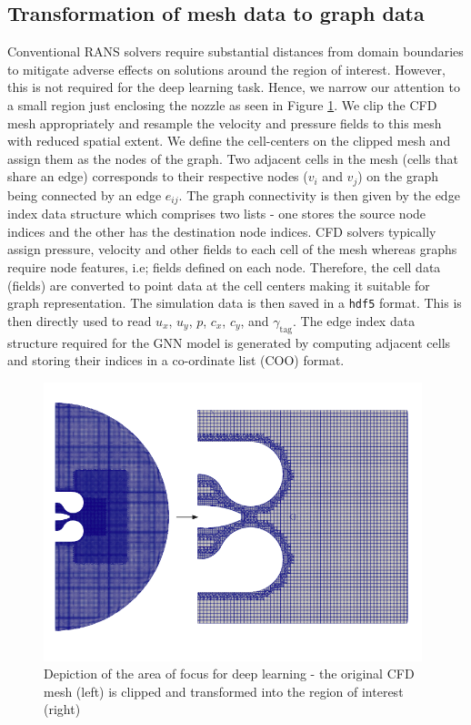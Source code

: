\subsection{Transformation of mesh data to graph data}
Conventional RANS solvers require substantial distances from domain boundaries to mitigate adverse effects on solutions around the region of interest. However, this is not required for the deep learning task. Hence, we narrow our attention to a small region just enclosing the nozzle as seen in Figure \ref{clipmesh}. We clip the CFD mesh appropriately and resample the velocity and pressure fields to this mesh with reduced spatial extent. We define the cell-centers on the clipped mesh and assign them as the nodes of the graph. Two adjacent cells in the mesh (cells that share an edge) corresponds to their respective nodes ($v_i$ and $v_j$) on the graph being connected by an edge $e_{ij}$. The graph connectivity is then given by the edge index data structure which comprises two lists - one stores the source node indices and the other has the destination node indices. CFD solvers typically assign pressure, velocity and other fields to each cell of the mesh whereas graphs require node features, i.e; fields defined on each node. Therefore, the cell data (fields) are converted to point data at the cell centers making it suitable for graph representation. The simulation data is then saved in a \verb|hdf5| format. This is then directly used to read $u_{x}$, $u_{y}$, $p$, $c_x$, $c_y$, and $\gamma_{\operatorname{tag}}$. The edge index data structure required for the GNN model is generated by computing adjacent cells and storing their indices in a co-ordinate list (COO) format. 
\begin{figure}[ht]
    \centering
    \includegraphics[width=11cm]{images/Methodology/Clipped.png}
    \caption{Depiction of the area of focus for deep learning - the original CFD mesh (left) is clipped and transformed into the region of interest (right)}
    \label{clipmesh}
\end{figure}
